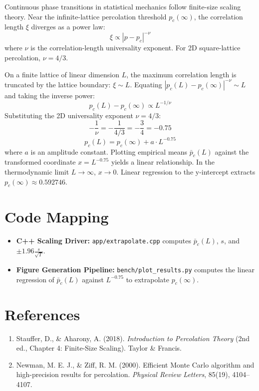 \documentclass[11pt,a4paper]{article}
\begin{document}
Continuous phase transitions in statistical mechanics follow finite-size scaling theory.
Near the infinite-lattice percolation threshold $p_c(\infty)$, the correlation length $\xi$ diverges as a power law:
\[
\xi \propto |p - p_c|^{-\nu}
\]
where $\nu$ is the correlation-length universality exponent. For 2D square-lattice percolation, $\nu = 4/3$.

On a finite lattice of linear dimension $L$, the maximum correlation length is truncated by the lattice boundary: $\xi \sim L$.
Equating $|p_c(L) - p_c(\infty)|^{-\nu} \sim L$ and taking the inverse power:
\[
p_c(L) - p_c(\infty) \propto L^{-1/\nu}
\]
Substituting the 2D universality exponent $\nu = 4/3$:
\[
-\frac{1}{\nu} = -\frac{1}{4/3} = -\frac{3}{4} = -0.75
\]
\[
p_c(L) = p_c(\infty) + a \cdot L^{-0.75}
\]
where $a$ is an amplitude constant.
Plotting empirical means $\bar{p}_c(L)$ against the transformed coordinate $x = L^{-0.75}$ yields a linear relationship. In the thermodynamic limit $L \to \infty$, $x \to 0$. Linear regression to the y-intercept extracts $p_c(\infty) \approx 0.592746$.

\section{Code Mapping}
\begin{itemize}
    \item \textbf{C++ Scaling Driver:} \texttt{app/extrapolate.cpp} computes $\bar{p}_c(L)$, $s$, and $\pm 1.96 \frac{s}{\sqrt{T}}$.
    \item \textbf{Figure Generation Pipeline:} \texttt{bench/plot\_results.py} computes the linear regression of $\bar{p}_c(L)$ against $L^{-0.75}$ to extrapolate $p_c(\infty)$.
\end{itemize}

\section{References}
\begin{enumerate}
    \item Stauffer, D., \& Aharony, A. (2018). \textit{Introduction to Percolation Theory} (2nd ed., Chapter 4: Finite-Size Scaling). Taylor \& Francis.
    \item Newman, M. E. J., \& Ziff, R. M. (2000). Efficient Monte Carlo algorithm and high-precision results for percolation. \textit{Physical Review Letters}, 85(19), 4104--4107.
\end{enumerate}
\end{document}
